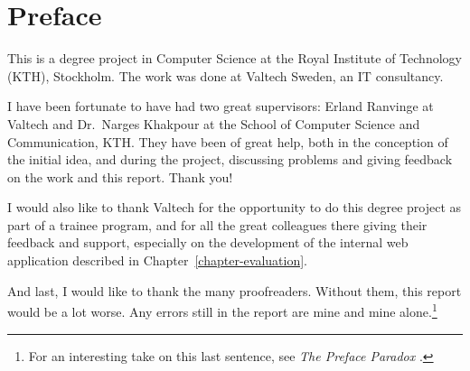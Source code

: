 
\pagestyle{newchap}
\chapter*{Preface}

This is a degree project in Computer Science at the Royal Institute of
Technology (KTH), Stockholm. The work was done at Valtech Sweden, an IT
consultancy.

I have been fortunate to have had two great supervisors: Erland Ranvinge at
Valtech and Dr.\ Narges Khakpour at the School of Computer Science and
Communication, KTH\@. They have been of great help, both in the conception of
the initial idea, and during the project, discussing problems and giving
feedback on the work and this report. Thank you!

I would also like to thank Valtech for the opportunity to do this degree
project as part of a trainee program, and for all the great colleagues there
giving their feedback and support, especially on the development of the
internal web application described in Chapter~\ref{chapter-evaluation}.

And last, I would like to thank the many proofreaders. Without them, this
report would be a lot worse. Any errors still in the report are mine and mine
alone.\footnote{For an interesting take on this last sentence, see \emph{The
  Preface Paradox} \cite{makinson65prefaceparadox,
williams87prefaceparadoxdissolved}.}
